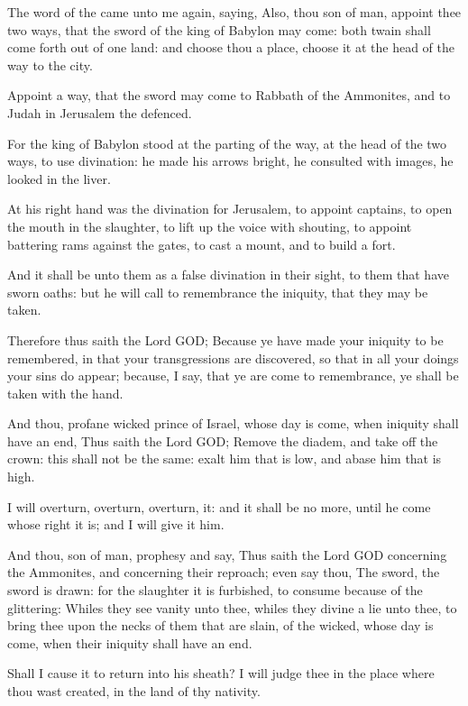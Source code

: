 \verse The word of the \LORD came unto me again, saying, \verse Also, thou son of man, appoint thee two ways, that the sword of the king of Babylon may come: both twain shall come forth out of one land: and choose thou a place, choose it at the head of the way to the city.

\verse Appoint a way, that the sword may come to Rabbath of the Ammonites, and to Judah in Jerusalem the defenced.

\verse For the king of Babylon stood at the parting of the way, at the head of the two ways, to use divination: he made his arrows bright, he consulted with images, he looked in the liver.

\verse At his right hand was the divination for Jerusalem, to appoint captains, to open the mouth in the slaughter, to lift up the voice with shouting, to appoint battering rams against the gates, to cast a mount, and to build a fort.

\verse And it shall be unto them as a false divination in their sight, to them that have sworn oaths: but he will call to remembrance the iniquity, that they may be taken.

\verse Therefore thus saith the Lord GOD; Because ye have made your iniquity to be remembered, in that your transgressions are discovered, so that in all your doings your sins do appear; because, I say, that ye are come to remembrance, ye shall be taken with the hand.

\verse And thou, profane wicked prince of Israel, whose day is come, when iniquity shall have an end, \verse Thus saith the Lord GOD; Remove the diadem, and take off the crown: this shall not be the same: exalt him that is low, and abase him that is high.

\verse I will overturn, overturn, overturn, it: and it shall be no more, until he come whose right it is; and I will give it him.

\verse And thou, son of man, prophesy and say, Thus saith the Lord GOD concerning the Ammonites, and concerning their reproach; even say thou, The sword, the sword is drawn: for the slaughter it is furbished, to consume because of the glittering: \verse Whiles they see vanity unto thee, whiles they divine a lie unto thee, to bring thee upon the necks of them that are slain, of the wicked, whose day is come, when their iniquity shall have an end.

\verse Shall I cause it to return into his sheath? I will judge thee in the place where thou wast created, in the land of thy nativity.

